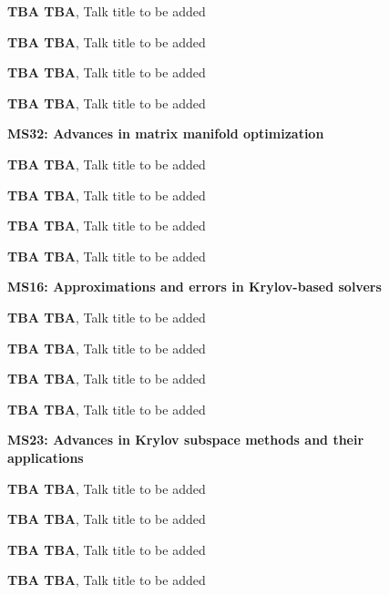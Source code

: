 \documentclass[ILAS2025-program.tex]{subfiles}
\begin{document}
\begin{description}
\begin{description}
    \item[] \textbf{TBA TBA}, Talk title to be added
        \item[] \textbf{TBA TBA}, Talk title to be added
        \item[] \textbf{TBA TBA}, Talk title to be added
        \item[] \textbf{TBA TBA}, Talk title to be added
        \end{description}
    \begin{description}
    \item[] \textbf{MS32: Advances in matrix manifold optimization} 
    \item[] \textbf{TBA TBA}, Talk title to be added
        \item[] \textbf{TBA TBA}, Talk title to be added
        \item[] \textbf{TBA TBA}, Talk title to be added
        \item[] \textbf{TBA TBA}, Talk title to be added
        \end{description}
    \begin{description}
    \item[] \textbf{MS16: Approximations and errors in Krylov-based solvers} 
    \item[] \textbf{TBA TBA}, Talk title to be added
        \item[] \textbf{TBA TBA}, Talk title to be added
        \item[] \textbf{TBA TBA}, Talk title to be added
        \item[] \textbf{TBA TBA}, Talk title to be added
        \end{description}
    \begin{description}
    \item[] \textbf{MS23: Advances in Krylov subspace methods and their applications} 
    \item[] \textbf{TBA TBA}, Talk title to be added
        \item[] \textbf{TBA TBA}, Talk title to be added
        \item[] \textbf{TBA TBA}, Talk title to be added
        \item[] \textbf{TBA TBA}, Talk title to be added
        \end{description}
    \end{description}
    \newpage
\end{document}
